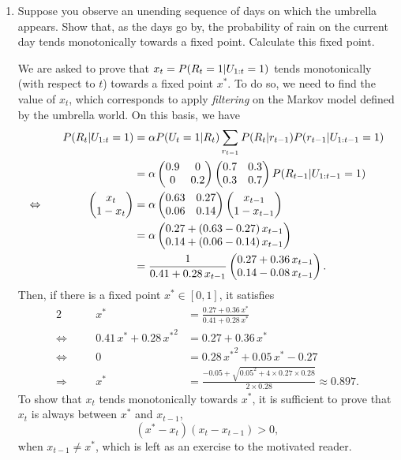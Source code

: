 \documentclass[11pt, a4paper]{article}
\begin{document}
\begin{enumerate}
    \item Suppose you observe an unending sequence of days on which the umbrella appears. Show that, as the days go by, the probability of rain on the current day tends monotonically towards a fixed point. Calculate this fixed point.
    
    \begin{solution}
        We are asked to prove that $x_t = P(R_t = 1 \vert U_{1:t} = 1)$ tends monotonically (with respect to $t$) towards a fixed point $x^*$. To do so, we need to find the value of $x_t$, which corresponds to apply \emph{filtering} on the Markov model defined by the umbrella world. On this basis, we have
        \begin{alignat*}{2}
            && P(R_t \vert U_{1:t} = 1) & = \alpha P(U_t = 1 \vert R_t) \sum_{r_{t-1}} P(R_t \vert r_{t-1}) P(r_{t-1} \vert U_{1:t-1}  = 1) \\
            &&& = \alpha \begin{pmatrix}0.9 & 0 \\ 0 & 0.2\end{pmatrix} \begin{pmatrix}0.7 & 0.3 \\ 0.3 & 0.7\end{pmatrix} P(R_{t-1} \vert U_{1:t-1} = 1) \\
            \Leftrightarrow \quad && \begin{pmatrix}x_{t} \\ 1 - x_{t}\end{pmatrix} & = \alpha \begin{pmatrix}0.63 & 0.27 \\ 0.06 & 0.14\end{pmatrix} \begin{pmatrix}x_{t-1} \\ 1 - x_{t-1}\end{pmatrix} \\
            &&& = \alpha \begin{pmatrix}0.27 + (0.63 - 0.27) \, x_{t-1} \\ 0.14 + (0.06 - 0.14) \, x_{t-1}\end{pmatrix} \\
            &&& = \frac{1}{0.41 + 0.28 \, x_{t-1}} \begin{pmatrix}0.27 + 0.36 \, x_{t-1} \\ 0.14 - 0.08 \, x_{t-1}\end{pmatrix} .
        \end{alignat*}
        Then, if there is a fixed point $x^* \in [0, 1]$, it satisfies
        \begin{alignat*}{2}
            && x^* & = \frac{0.27 + 0.36 \, x^*}{0.41 + 0.28 \, x^*} \\
            \Leftrightarrow \quad && 0.41 \, x^* + 0.28 \, {x^*}^2 & = 0.27 + 0.36 \, x^* \\
            \Leftrightarrow \quad && 0 & = 0.28 \, {x^*}^2 + 0.05 \, x^* - 0.27 \\
            \Rightarrow \quad && x^* & = \frac{-0.05 + \sqrt{0.05^2 + 4 \times 0.27 \times 0.28}}{2 \times 0.28} \approx \num{0.897} .
        \end{alignat*}
        To show that $x_t$ tends monotonically towards $x^*$, it is sufficient to prove that $x_t$ is always between $x^*$ and $x_{t-1}$, \ie{}
        \begin{equation*}
            (x^* - x_t) (x_t - x_{t-1}) > 0,
        \end{equation*}
        when $x_{t-1} \neq x^*$, which is left as an exercise to the motivated reader.
    \end{solution}
    

\end{enumerate}
\end{document}
